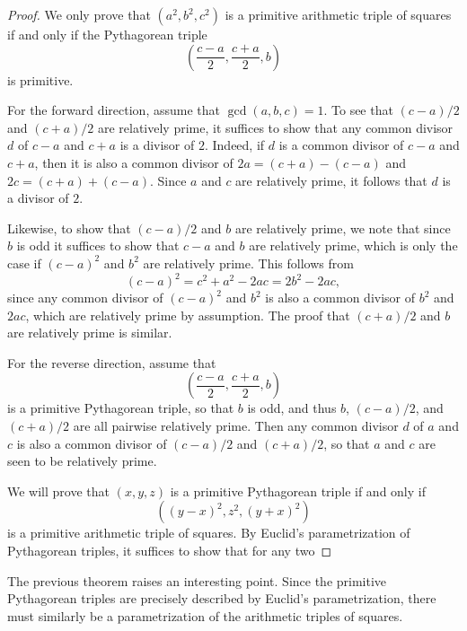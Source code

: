 \begin{proof}
  We only prove that $(a^2,b^2,c^2)$ is a primitive arithmetic triple of squares if and only if the Pythagorean triple
  \begin{equation*}
    \left(\frac{c-a}{2},\frac{c+a}{2},b\right)
  \end{equation*}
  is primitive.

  For the forward direction, assume that $\gcd(a,b,c)=1$. To see that $(c-a)/2$ and $(c+a)/2$ are relatively prime, it suffices to show that any common divisor $d$ of $c-a$ and $c+a$ is a divisor of $2$. Indeed, if $d$ is a common divisor of $c-a$ and $c+a$, then it is also a common divisor of $2a=(c+a)-(c-a)$ and $2c=(c+a)+(c-a)$. Since $a$ and $c$ are relatively prime, it follows that $d$ is a divisor of $2$.

  Likewise, to show that $(c-a)/2$ and $b$ are relatively prime, we note that since $b$ is odd it suffices to show that $c-a$ and $b$ are relatively prime, which is only the case if $(c-a)^2$ and $b^2$ are relatively prime. This follows from
  \begin{equation*}
    (c-a)^2=c^2+a^2-2ac=2b^2-2ac,
  \end{equation*}
  since any common divisor of $(c-a)^2$ and $b^2$ is also a common divisor of $b^2$ and $2ac$, which are relatively prime by assumption. The proof that $(c+a)/2$ and $b$ are relatively prime is similar. 

  For the reverse direction, assume that
  \begin{equation*}
    \left(\frac{c-a}{2},\frac{c+a}{2},b\right)
  \end{equation*}
  is a primitive Pythagorean triple, so that $b$ is odd, and thus $b$, $(c-a)/2$, and $(c+a)/2$ are all pairwise relatively prime. Then any common divisor $d$ of $a$ and $c$ is also a common divisor of $(c-a)/2$ and $(c+a)/2$, so that $a$ and $c$ are seen to be relatively prime.

  We will prove that $(x,y,z)$ is a primitive Pythagorean triple if and only if
  \begin{equation*}
    ((y-x)^2,z^2,(y+x)^2)
  \end{equation*}
  is a primitive arithmetic triple of squares. By Euclid's parametrization of Pythagorean triples, it suffices to show that for any two
\end{proof}

The previous theorem raises an interesting point. Since the primitive Pythagorean triples are precisely described by Euclid's parametrization, there must similarly be a parametrization of the arithmetic triples of squares.

